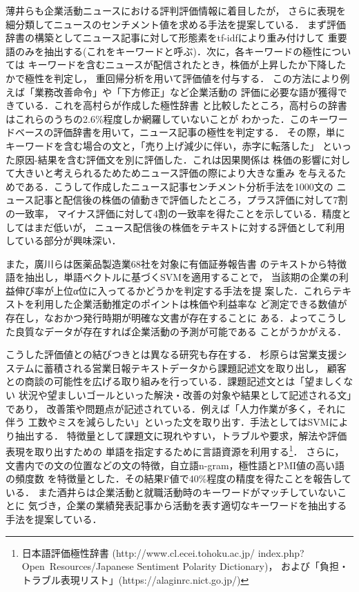 \documentclass[twocolumn]{jarticle}
\begin{document}
薄井ら\cite{usui2014}も企業活動ニュースにおける評判評価情報に着目したが，
さらに表現を細分類してニュースのセンチメント値を求める手法を提案している．
まず評価辞書の構築としてニュース記事に対して形態素をtf-idfにより重み付けして
重要語のみを抽出する(これをキーワードと呼ぶ)．次に，各キーワードの極性については
キーワードを含むニュースが配信されたとき，株価が上昇したか下降したかで極性を判定し，
重回帰分析を用いて評価値を付与する．
この方法により例えば「業務改善命令」や「下方修正」など企業活動の
評価に必要な語が獲得できている．これを高村らが作成した極性辞書\cite{takamura05}
と比較したところ，高村らの辞書はこれらのうちの2.6\%程度しか網羅していないことが
わかった．このキーワードベースの評価辞書を用いて，ニュース記事の極性を判定する．
その際，単にキーワードを含む場合の文と，「売り上げ減少に伴い，赤字に転落した」
といった原因-結果を含む評価文を別に評価した．これは因果関係は
株価の影響に対して大きいと考えられるためためニュース評価の際により大きな重み
を与えるためである．こうして作成したニュース記事センチメント分析手法を1000文の
ニュース記事と配信後の株価の値動きで評価したところ，プラス評価に対して7割の一致率，
マイナス評価に対して4割の一致率を得たことを示している．精度としてはまだ低いが，
ニュース配信後の株価をテキストに対する評価として利用している部分が興味深い．

また，廣川\cite{hirokawa2013}らは医薬品製造業68社を対象に有価証券報告書
のテキストから特徴語を抽出し，単語ベクトルに基づくSVMを適用することで，
当該期の企業の利益伸び率が上位α位に入ってるかどうかを判定する手法を提
案した．これらテキストを利用した企業活動推定のポイントは株価や利益率な
ど測定できる数値が存在し，なおかつ発行時期が明確な文書が存在することに
ある．よってこうした良質なデータが存在すれば企業活動の予測が可能である
ことがうかがえる．

こうした評価値との結びつきとは異なる研究も存在する．
杉原ら\cite{sugihara2012}は営業支援システムに蓄積される営業日報テキストデータから課題記述文を取り出し，
顧客との商談の可能性を広げる取り組みを行っている．課題記述文とは「望ましくない
状況や望ましいゴールといった解決・改善の対象や結果として記述される文」であり，
改善策や問題点が記述されている．例えば「人力作業が多く，それに伴う
工数やミスを減らしたい」といった文を取り出す．手法としてはSVMにより抽出する．
特徴量として課題文に現れやすい，トラブルや要求，解法や評価表現を取り出すための
単語を指定するために言語資源を利用する\footnote{日本語評価極性辞書
(http://www.cl.ecei.tohoku.ac.jp/
index.php?Open~Resources\slash{}Japanese Sentiment
 Polarity Dictionary)，
および「負担・トラブル表現リスト」(https://alaginrc.nict.go.jp/)}．
さらに，文書内での文の位置などの文の特徴，自立語n-gram，極性語とPMI値の高い語の頻度数
を特徴量とした．その結果F値で40\%程度の精度を得たことを報告している．
また酒井\cite{sakai2014}らは企業活動と就職活動時のキーワードがマッチしていないことに
気づき，企業の業績発表記事から活動を表す適切なキーワードを抽出する手法を提案している．
\end{document}
